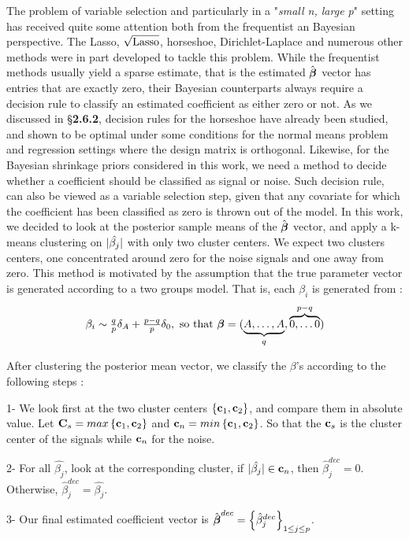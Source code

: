 \documentclass[ba]{imsart}
\begin{document}
The problem of variable selection and particularly in a "\textit{small n, large p}" setting has received quite some attention both from  the frequentist an Bayesian perspective. The Lasso, $\sqrt{\text{\rm{Lasso}}}$, horseshoe, Dirichlet-Laplace and numerous other methods were in part developed to tackle this problem. While the frequentist methods usually yield a sparse estimate, that is the estimated $\hat{\boldsymbol{\beta}}$ vector has entries that are exactly zero, their Bayesian counterparts always require a decision rule to classify an estimated coefficient as either zero or not. As we discussed in \S \textbf{2.6.2}, decision rules for the horseshoe have already been studied, and shown to be optimal under some conditions for the normal means problem and regression settings where the design matrix is orthogonal. Likewise, for the Bayesian shrinkage priors considered in this work, we need a method to decide whether a coefficient should be classified as signal or noise. Such decision rule, can also be viewed as a variable selection step, given that any covariate for which the coefficient has been classified as zero is thrown out of the model. In this work, we decided to look at the posterior sample means of the $\hat{\boldsymbol{\beta}}$ vector, and apply a k-means clustering on $\lvert\hat{\beta_j}\rvert $ with only two cluster centers. We expect two clusters centers, one concentrated around zero for the noise signals and one away from zero. This method is motivated by the assumption that the true parameter vector is generated according to a two groups model. That is, each $\beta_i$ is generated from : 
$$ \beta_i \sim \tfrac{q}{p} \delta_{A} + \tfrac{p-q}{p} \delta_{0}, \ \text{so that }  \boldsymbol{\beta} = ( \underbrace{ A, \ldots ,A}_{q}, \overbrace{0, \ldots 0}^{p-q} ) $$

After clustering the posterior mean vector, we classify the $\beta$'s according to the following steps : 
\ben
\item[1-] We look first at the two cluster centers $\left\lbrace {\bf c}_1 , {\bf c}_2 \right\rbrace $, and compare them in absolute value. Let ${\bf C}_s = max\left\lbrace {\bf c}_1 , {\bf c}_2 \right\rbrace$ and ${\bf c}_n = min\left\lbrace {\bf c}_1 , {\bf c}_2 \right\rbrace$. So that the ${\bf c}_s$ is the cluster center of the signals while ${\bf c}_n$ for the noise.
\item[2-] For all $\hat{\beta_j}$, look at the corresponding cluster, if $\lvert\hat{\beta_j}\rvert \in {\bf c}_n $, then $\hat{\beta}_j^{dec}= 0$. Otherwise, $\hat{\beta}_j^{dec} = \hat{\beta_j}$.
\item[3-] Our final estimated coefficient vector is $\hat{\boldsymbol{\beta}}^{dec} = \left\lbrace \hat{\beta}^{dec}_{j} \right\rbrace_{1\leq j \leq p}$.
\een
\end{document}
